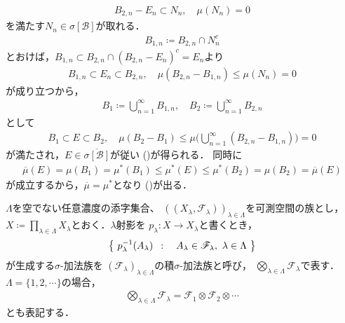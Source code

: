 \begin{prf}
\begin{description}
\begin{align}
						B_{2,n} - E_n \subset N_n, \quad \mu(N_n) = 0
					\end{align}
					を満たす$N_n \in \sigma[\mathcal{B}]$が取れる．
					\begin{align}
						B_{1,n} \coloneqq B_{2,n} \cap N_n^c
					\end{align}
					とおけば，$B_{1,n} \subset B_{2,n} \cap (B_{2,n} - E_n)^c = E_n$より
					\begin{align}
						B_{1,n} \subset E_n \subset B_{2,n},
						\quad \mu(B_{2,n} - B_{1,n}) \leq \mu(N_n) = 0
					\end{align}
					が成り立つから，
					\begin{align}
						B_1 \coloneqq \bigcup_{n=1}^\infty B_{1,n},
						\quad B_2 \coloneqq \bigcup_{n=1}^\infty B_{2,n}
					\end{align}
					として
					\begin{align}
						B_1 \subset E \subset B_2,
						\quad \mu(B_2 - B_1) \leq \mu\Biggl( \bigcup_{n=1}^\infty(B_{2,n} - B_{1,n}) \Biggr) = 0
					\end{align}
					が満たされ，$E \in \overline{\sigma[\mathcal{B}]}$が従い
					()が得られる．
					同時に
					\begin{align}
						\overline{\mu}(E) = \mu(B_1) = \mu^*(B_1)
						\leq \mu^*(E) \leq \mu^*(B_2) = \mu(B_2) = \overline{\mu}(E)
					\end{align}
					が成立するから，$\overline{\mu} = \mu^*$となり
					()が出る．
					\QED
			\end{description}
		\end{prf}
		
	\begin{screen}
		\begin{dfn}
			$\Lambda$を空でない任意濃度の添字集合、
			$\left((X_\lambda,\mathscr{F}_\lambda)\right)_{\lambda \in \Lambda}$を可測空間の族とし，
			$X \coloneqq \prod_{\lambda \in \Lambda} X_\lambda$とおく．$\lambda$射影を
			$p_\lambda:X \longrightarrow X_\lambda$と書くとき，
			\begin{align}
				\left\{\ p_\lambda^{-1}(A_\lambda)\ \, : \quad A_\lambda \in \mathscr{F}_\lambda,\ \lambda \in \Lambda\ \right\}
			\end{align}
			が生成する$\sigma$-加法族を
			$(\mathscr{F}_\lambda)_{\lambda \in \Lambda}$の積$\sigma$-加法族と呼び，
			$\bigotimes_{\lambda \in \Lambda} \mathscr{F}_\lambda$で表す．
			$\Lambda = \{1,2,\cdots\}$の場合，
			\begin{align}
				\bigotimes_{\lambda \in \Lambda} \mathscr{F}_\lambda
				= \mathscr{F}_1 \otimes \mathscr{F}_2 \otimes \cdots
			\end{align}
			とも表記する．
		\end{dfn}
	\end{screen}
		
